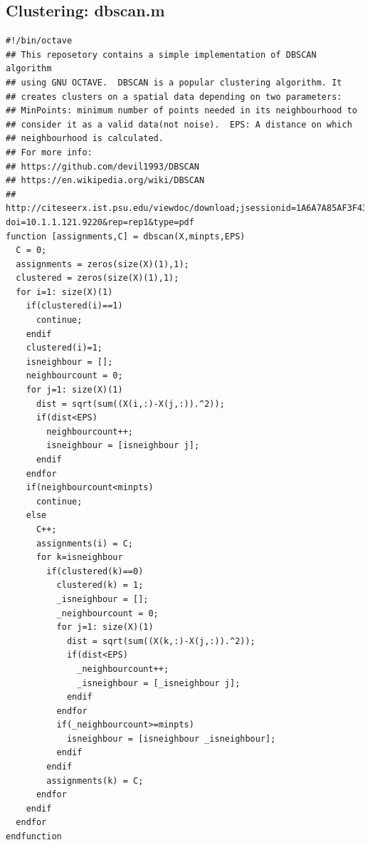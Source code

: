 \documentclass[11pt, a4paper, oneside, twocolumn]{report}
\begin{document}
\subsection{Clustering: dbscan.m}\label{s:c:dbscan}
\begin{verbatim}
#!/bin/octave
## This reposetory contains a simple implementation of DBSCAN algorithm
## using GNU OCTAVE.  DBSCAN is a popular clustering algorithm. It
## creates clusters on a spatial data depending on two parameters:
## MinPoints: minimum number of points needed in its neighbourhood to
## consider it as a valid data(not noise).  EPS: A distance on which
## neighbourhood is calculated.
## For more info:
## https://github.com/devil1993/DBSCAN
## https://en.wikipedia.org/wiki/DBSCAN
## http://citeseerx.ist.psu.edu/viewdoc/download;jsessionid=1A6A7A85AF3F43BCBF66D847FEC8F8C5?doi=10.1.1.121.9220&rep=rep1&type=pdf
function [assignments,C] = dbscan(X,minpts,EPS)
  C = 0;
  assignments = zeros(size(X)(1),1);
  clustered = zeros(size(X)(1),1);
  for i=1: size(X)(1)
    if(clustered(i)==1)
      continue;
    endif
    clustered(i)=1;
    isneighbour = [];
    neighbourcount = 0;
    for j=1: size(X)(1)
      dist = sqrt(sum((X(i,:)-X(j,:)).^2));
      if(dist<EPS)
        neighbourcount++;
        isneighbour = [isneighbour j];
      endif
    endfor
    if(neighbourcount<minpts)
      continue;
    else
      C++;
      assignments(i) = C;
      for k=isneighbour
        if(clustered(k)==0)
          clustered(k) = 1;
          _isneighbour = [];
          _neighbourcount = 0;
          for j=1: size(X)(1)
            dist = sqrt(sum((X(k,:)-X(j,:)).^2));
            if(dist<EPS)
              _neighbourcount++;
              _isneighbour = [_isneighbour j];
            endif
          endfor
          if(_neighbourcount>=minpts)
            isneighbour = [isneighbour _isneighbour];
          endif
        endif
        assignments(k) = C;
      endfor
    endif
  endfor
endfunction
\end{verbatim}
\end{document}
